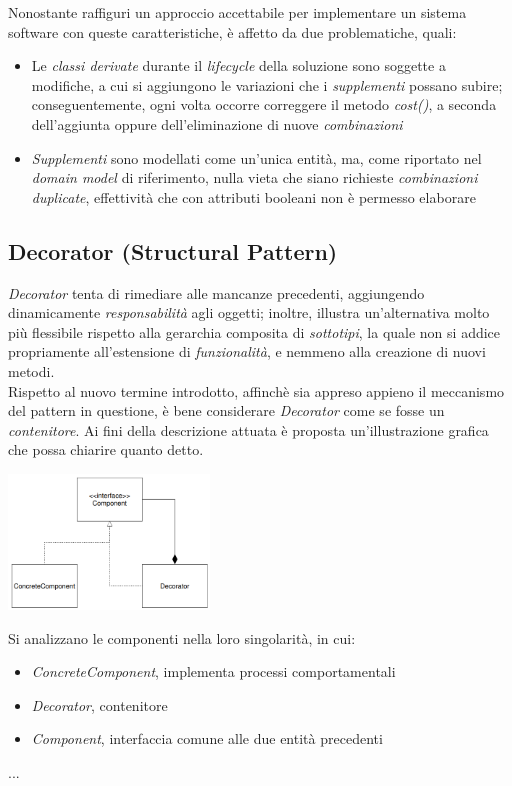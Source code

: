 \documentclass{article}
\begin{document}
Nonostante raffiguri un approccio accettabile per implementare un sistema software con queste caratteristiche, è affetto da due problematiche, quali:
\begin{itemize}[label={-}]
    \itemsep0em
    \item Le \textit{classi derivate} durante il \textit{lifecycle} della soluzione sono soggette a modifiche, a cui si aggiungono le variazioni che i \textit{supplementi} possano subire; conseguentemente, ogni volta occorre correggere il metodo \textit{cost()}, a seconda dell'aggiunta oppure dell'eliminazione di nuove \textit{combinazioni}    
    \item \textit{Supplementi} sono modellati come un'unica entità, ma, come riportato nel \textit{domain model} di riferimento, nulla vieta che siano richieste \textit{combinazioni duplicate}, effettività che con attributi booleani non è permesso elaborare
\end{itemize} 

\subsection*{Decorator (Structural Pattern)}
\large
\textit{Decorator} tenta di rimediare alle mancanze precedenti, aggiungendo dinamicamente \textit{responsabilità} agli oggetti; inoltre, illustra un'alternativa molto più flessibile rispetto alla gerarchia composita di \textit{sottotipi}, la quale non si addice propriamente all'estensione di \textit{funzionalità}, e nemmeno alla creazione di nuovi metodi.\vspace*{7pt}\\
Rispetto al nuovo termine introdotto, affinchè sia appreso appieno il meccanismo del pattern in questione, è bene considerare \textit{Decorator} come se fosse un \textit{contenitore}. Ai fini della descrizione attuata è proposta un'illustrazione grafica che possa chiarire quanto detto.
\begin{center}
    \includegraphics[width=0.4\textwidth]{foto 5.png}
\end{center} 
Si analizzano le componenti nella loro singolarità, in cui:
\begin{itemize}[label={-}]
    \itemsep0em
    \item \textit{ConcreteComponent}, implementa processi comportamentali 
    \item \textit{Decorator}, contenitore 
    \item \textit{Component}, interfaccia comune alle due entità precedenti
\end{itemize}
...
\end{document}
